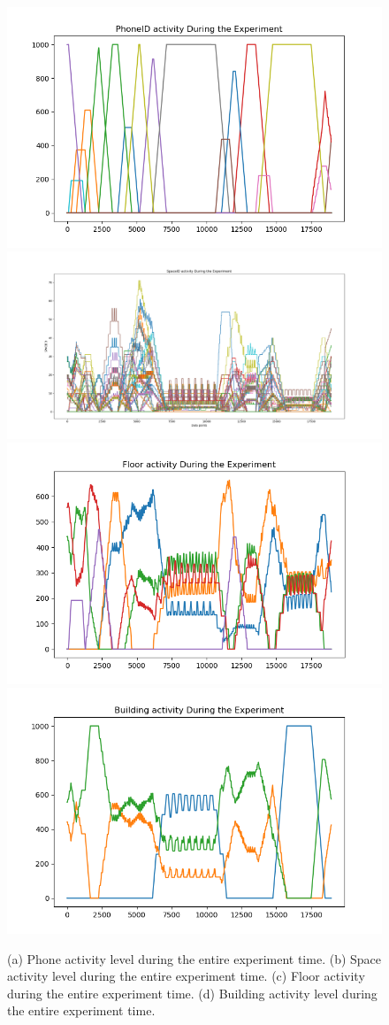\begin{figure}
    \centering
        \includegraphics[width = 7 cm]{image/Chapters/Chapter6/phoneTime.png}\hfill
        \includegraphics[width = 7 cm]{image/Chapters/Chapter6/spaceidAccumulat.png}\hfill
        \includegraphics[width = 7 cm]{image/Chapters/Chapter6/floorTime.png}\hfill
        \includegraphics[width = 7 cm]{image/Chapters/Chapter6/buildingTime.png}
    \caption{(a) Phone activity level during the entire experiment time. (b) Space activity level during the entire experiment time. (c) Floor activity during the entire experiment time. (d) Building activity level during the entire experiment time.}
    \label{alltogether}
\end{figure}






